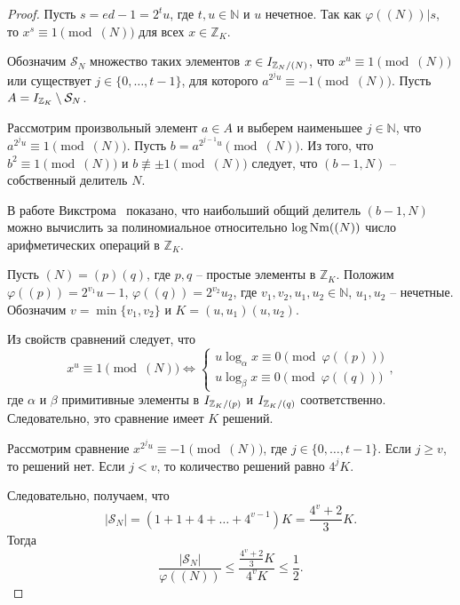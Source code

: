 \documentclass[_00_dissertation.tex]{subfiles}
\begin{document}
\begin{proof}
    Пусть $s = ed - 1 = 2^t u$, где $t, u \in \mathbb{N}$ и $u$ нечетное.
    Так как $\varphi((N)) | s$, то $x^s \equiv 1 \pmod{(N)}$ для всех $x \in \mathbb{Z}_K$.
    
    Обозначим $\mathcal{S}_N$ множество таких элементов $x \in I_{\mathbb{Z}_N / (N)}$, что $x^u \equiv 1 \pmod{(N)}$ или существует $j \in \{0, \dots, t-1\}$, для которого $a^{2^j u} \equiv -1 \pmod{(N)}$.
    Пусть $A = I_{\mathbb{Z}_K} \setminus \mathcal{S}_N$.
    
    Рассмотрим произвольный элемент $a \in A$ и выберем наименьшее $j \in \mathbb{N}$, что $a^{2^j u} \equiv 1 \pmod{(N)}$.
    Пусть $b = a^{2^{j-1} u} \pmod{(N)}$.
    Из того, что $b^2 \equiv 1 \pmod{(N)}$ и $b \not\equiv \pm 1 \pmod{(N)}$ следует, что $(b - 1, N)$ -- собственный делитель $N$.
    
    В работе Викстрома~\cite{source:Wikstrom} показано, что наибольший общий делитель $(b - 1, N)$ можно вычислить за полиномиальное относительно $\log \textrm{Nm}((N))$ число арифметических операций в $\mathbb{Z}_K$.
    
    Пусть $(N) = (p)(q)$, где $p, q$ -- простые элементы в $\mathbb{Z}_K$.
    Положим $\varphi((p)) = 2^{v_1} u-1$, $\varphi((q)) = 2^{v_2} u_2$, где $v_1, v_2, u_1, u_2 \in \mathbb{N}$, $u_1, u_2$ -- нечетные.
    Обозначим $v = \min\{v_1, v_2\}$ и $K = (u, u_1)(u, u_2)$.
    
    Из свойств сравнений следует, что
    \begin{equation*}
        x^u \equiv 1 \pmod{(N)}
        \Leftrightarrow
        \begin{cases}
            u \log_{\alpha} x \equiv 0 \pmod{\varphi((p))}\\
            u \log_{\beta} x \equiv 0 \pmod{\varphi((q))}
        \end{cases},
    \end{equation*}
    где $\alpha$ и $\beta$ примитивные элементы в $I_{\mathbb{Z}_K / (p)}$ и $I_{\mathbb{Z}_K / (q)}$ соответственно.
    Следовательно, это сравнение имеет $K$ решений.
    
    Рассмотрим сравнение $x^{2^j u} \equiv -1 \pmod{(N)}$, где $j \in \{0, \dots, t - 1\}$.
    Если $j \ge v$, то решений нет.
    Если $j < v$, то количество решений равно $4^j K$.
    
    Следовательно, получаем, что
    \begin{equation*}
        |\mathcal{S}_N| = \left(
            1 + 1 + 4 + \dots + 4^{v-1}
        \right)K = \frac{4^v + 2}{3}K.
    \end{equation*}
    Тогда
    \begin{equation*}
        \frac{|\mathcal{S}_N|}{\varphi((N))} \le \frac{\frac{4^v + 2}{3}K}{4^v K} \le \frac{1}{2}.
    \end{equation*}
\end{proof}
\end{document}
